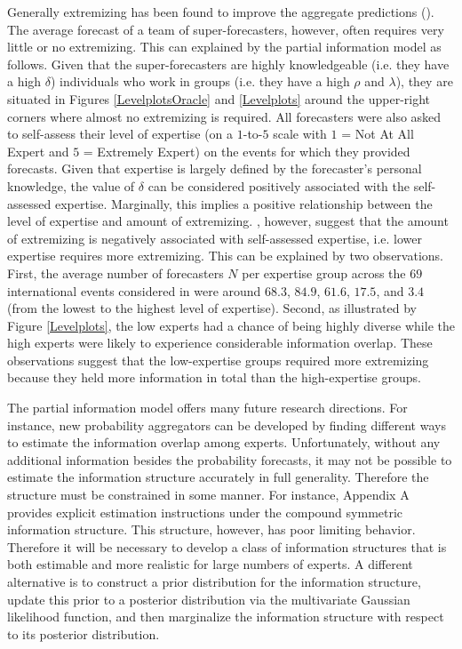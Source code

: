\documentclass[11pt]{article}
\theoremstyle{definition}
\theoremstyle{definition}
\begin{document}
Generally extremizing has been found to improve the aggregate predictions (\cite{mellers2014psychological}). The average forecast of a team of super-forecasters, however, often requires very little or no extremizing. This can explained by the partial information model as follows. Given that the  super-forecasters are highly knowledgeable (i.e. they have a high $\delta$) individuals who work in groups (i.e. they have a high $\rho$ and $\lambda$), they are situated in Figures \ref{LevelplotsOracle} and \ref{Levelplots} around the upper-right corners where almost no extremizing is required. All forecasters were also asked to self-assess their level of expertise (on a $1$-to-$5$ scale with $1$ = Not At All Expert and $5$ = Extremely Expert) on the events for which they provided forecasts. Given that expertise is largely defined by the forecaster's personal knowledge, the value of $\delta$ can be considered positively associated with the self-assessed expertise. Marginally, this implies a positive relationship between the level of expertise and amount of extremizing. \cite{satopaa}, however, suggest that the amount of extremizing is negatively associated with self-assessed expertise, i.e. lower expertise requires more extremizing. This can be explained by two observations. First, the average number of forecasters $N$ per expertise group across the $69$ international events considered in \cite{satopaa} were around $68.3$, $84.9$, $61.6$, $17.5$, and $3.4$ (from the lowest to the highest level of expertise). Second, as illustrated by Figure \ref{Levelplots}, the low experts had a chance of being highly diverse while the high experts were likely to experience considerable information overlap. These observations suggest that the low-expertise groups required more extremizing because they held more information in total than the high-expertise groups.


The partial information model offers many future research directions. For instance, new probability aggregators can be developed by finding different ways  to estimate the information overlap among experts. Unfortunately, without any additional information besides the probability forecasts, it may not be possible to estimate the information structure accurately in full generality. Therefore the structure must be constrained in some manner. For instance, Appendix A provides explicit estimation instructions under the compound symmetric information structure. This structure, however, has poor limiting behavior. Therefore it will be necessary to develop a class of information structures that is  both estimable and more realistic for large numbers of experts.  A different alternative is to construct a prior distribution for the information structure, update this prior to a posterior distribution via the multivariate Gaussian likelihood function, and then marginalize the information structure with respect to its posterior distribution.  
\end{document}
